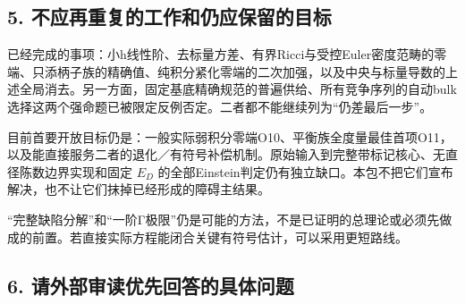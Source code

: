 \documentclass[
  10pt,
]{article}
\begin{document}
\hypertarget{ux4e0dux5e94ux518dux91cdux590dux7684ux5de5ux4f5cux548cux4ecdux5e94ux4fddux7559ux7684ux76eeux6807}{%
\subsection{5.
不应再重复的工作和仍应保留的目标}\label{ux4e0dux5e94ux518dux91cdux590dux7684ux5de5ux4f5cux548cux4ecdux5e94ux4fddux7559ux7684ux76eeux6807}}

已经完成的事项：小h线性阶、去标量方差、有界Ricci与受控Euler密度范畴的零端、只添柄子族的精确值、纯积分紧化零端的二次加强，以及中央与标量导数的上述全局消去。另一方面，固定基底精确规范的普遍供给、所有竞争序列的自动bulk选择这两个强命题已被限定反例否定。二者都不能继续列为``仍差最后一步''。

目前首要开放目标仍是：一般实际弱积分零端O10、平衡族全度量最佳首项O11，以及能直接服务二者的退化／有符号补偿机制。原始输入到完整带标记核心、无直径陈数边界实现和固定
\(E_D\)
的全部Einstein判定仍有独立缺口。本包不把它们宣布解决，也不让它们抹掉已经形成的障碍主结果。

``完整缺陷分解''和``一阶Γ极限''仍是可能的方法，不是已证明的总理论或必须先做成的前置。若直接实际方程能闭合关键有符号估计，可以采用更短路线。

\hypertarget{ux8bf7ux5916ux90e8ux5ba1ux8bfbux4f18ux5148ux56deux7b54ux7684ux5177ux4f53ux95eeux9898}{%
\subsection{6.
请外部审读优先回答的具体问题}\label{ux8bf7ux5916ux90e8ux5ba1ux8bfbux4f18ux5148ux56deux7b54ux7684ux5177ux4f53ux95eeux9898}}
\end{document}
